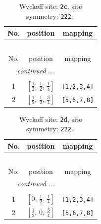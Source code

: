\documentclass[fleqn,8pt]{jsarticle}
\begin{document}
\renewcommand{\arraystretch}{1.2}
\begin{longtable}{ccc}
\caption{Wyckoff site: {\tt 2c}, site symmetry: {\tt 222.}}
 \\
 \hline \hline
No. & position & mapping \\ \hline \endfirsthead

\multicolumn{2}{l}{\tablename\ \thetable{}} \\
 \hline \hline
No. & position & mapping \\ \hline \endhead

 \hline \hline
\multicolumn{2}{r}{\footnotesize\it continued ...} \\ \endfoot

 \hline \hline
\multicolumn{2}{r}{} \\ \endlastfoot

1 & $\left[ \frac{1}{2},\, \frac{1}{2},\, \frac{1}{4} \right]$ & {\tt [1,2,3,4]} \\ \hline
2 & $\left[ \frac{1}{2},\, \frac{1}{2},\, \frac{3}{4} \right]$ & {\tt [5,6,7,8]} \\
\end{longtable}
\renewcommand{\arraystretch}{1.2}
\begin{longtable}{ccc}
\caption{Wyckoff site: {\tt 2d}, site symmetry: {\tt 222.}}
 \\
 \hline \hline
No. & position & mapping \\ \hline \endfirsthead

\multicolumn{2}{l}{\tablename\ \thetable{}} \\
 \hline \hline
No. & position & mapping \\ \hline \endhead

 \hline \hline
\multicolumn{2}{r}{\footnotesize\it continued ...} \\ \endfoot

 \hline \hline
\multicolumn{2}{r}{} \\ \endlastfoot

1 & $\left[ 0,\, \frac{1}{2},\, \frac{1}{4} \right]$ & {\tt [1,2,3,4]} \\ \hline
2 & $\left[ \frac{1}{2},\, 0,\, \frac{3}{4} \right]$ & {\tt [5,6,7,8]} \\
\end{longtable}
\renewcommand{\arraystretch}{1.2}
\end{document}
